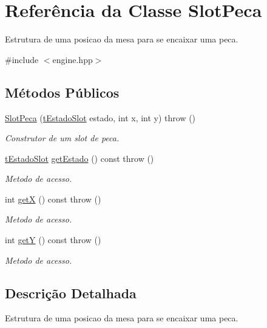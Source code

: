 \hypertarget{classSlotPeca}{
\section{Referência da Classe SlotPeca}
\label{classSlotPeca}
}


Estrutura de uma posicao da mesa para se encaixar uma peca.  




{\ttfamily \#include $<$engine.hpp$>$}

\subsection*{Métodos Públicos}
\begin{DoxyCompactItemize}
\item 
\hyperlink{classSlotPeca_a46e1d524300f306fefb5d95f5e32ecc6}{SlotPeca} (\hyperlink{engine_8hpp_aae1ca748942959d543e81a5183ed093c}{tEstadoSlot} estado, int x, int y)  throw ()
\begin{DoxyCompactList}\small\item\em Construtor de um slot de peca. \item\end{DoxyCompactList}\item 
\hyperlink{engine_8hpp_aae1ca748942959d543e81a5183ed093c}{tEstadoSlot} \hyperlink{classSlotPeca_a6e69685d9f4ee5d14beb7a7cf6d40c94}{getEstado} () const   throw ()
\begin{DoxyCompactList}\small\item\em Metodo de acesso. \item\end{DoxyCompactList}\item 
int \hyperlink{classSlotPeca_ae6067e513a0ffc76d52a39b529884938}{getX} () const   throw ()
\begin{DoxyCompactList}\small\item\em Metodo de acesso. \item\end{DoxyCompactList}\item 
int \hyperlink{classSlotPeca_a1260e8269bd934e52f42229133f016c8}{getY} () const   throw ()
\begin{DoxyCompactList}\small\item\em Metodo de acesso. \item\end{DoxyCompactList}\end{DoxyCompactItemize}


\subsection{Descrição Detalhada}
Estrutura de uma posicao da mesa para se encaixar uma peca. 

